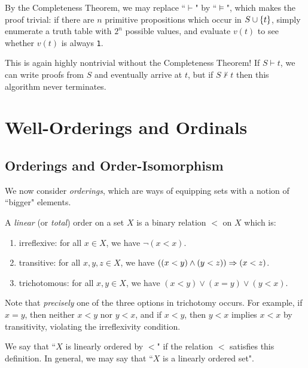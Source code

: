 \documentclass{article}
\begin{document}
\begin{prf}
    By the Completeness Theorem, we may replace ``$\vdash$" by ``$\vDash$", which makes the proof trivial: if there are $n$ primitive propositions which occur in $S \cup \left\lbrace t \right\rbrace$, simply enumerate a truth table with $2^n$ possible values, and evaluate $v(t)$ to see whether $v(t)$ is always \texttt{1}.
\end{prf}

\begin{note}
	This is again highly nontrivial without the Completeness Theorem! If $S \vdash t$, we can write proofs from $S$ and eventually arrive at $t$, but if $S \not\vdash t$ then this algorithm never terminates.
\end{note}


\pagebreak
\section{Well-Orderings and Ordinals}
\subsection{Orderings and Order-Isomorphism}

We now consider 	\textit{orderings}, which are ways of equipping sets with a notion of ``bigger" elements.

\begin{definition}
	\label{total-linear-order}
    A \textit{linear} (or \textit{total}) order on a set $X$ is a binary relation $<$ on $X$ which is:
    \begin{enumerate}
    	\item irreflexive: for all $x \in X$, we have $\lnot (x < x)$.
    	\item transitive: for all $x, y, z \in X$, we have $((x < y) \land (y < z)) \Rightarrow (x < z)$.
    	\item trichotomous: for all $x, y \in X$, we have $(x < y) \lor (x = y) \lor (y < x)$.
	\end{enumerate}
	Note that \textit{precisely} one of the three options in trichotomy occurs. For example, if $x = y$, then neither $x < y$ nor $y < x$, and if $x < y$, then $y < x$ implies $x < x$ by transitivity, violating the irreflexivity condition.
\end{definition}

We say that ``$X$ is linearly ordered by $<$" if the relation $<$ satisfies this definition. In general, we may say that ``$X$ is a linearly ordered set".
\end{document}
